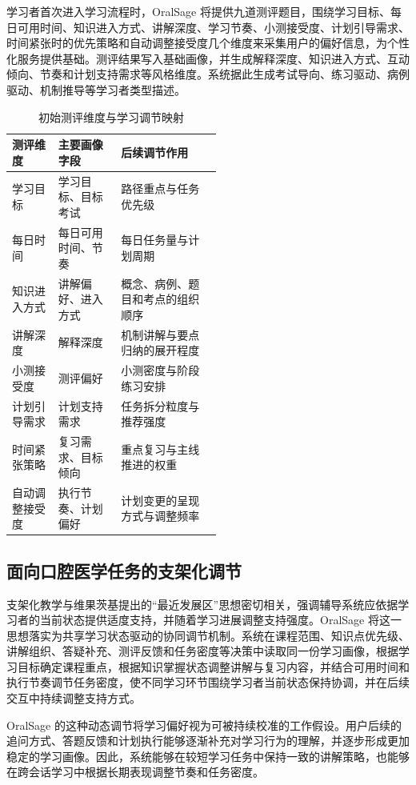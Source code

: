 学习者首次进入学习流程时，OralSage 将提供九道测评题目，围绕学习目标、每日可用时间、知识进入方式、讲解深度、学习节奏、小测接受度、计划引导需求、时间紧张时的优先策略和自动调整接受度几个维度来采集用户的偏好信息，为个性化服务提供基础。测评结果写入基础画像，并生成解释深度、知识进入方式、互动倾向、节奏和计划支持需求等风格维度。系统据此生成考试导向、练习驱动、病例驱动、机制推导等学习者类型描述。

\begin{table}[H]
  \centering
  \caption{初始测评维度与学习调节映射}
  \label{tab:onboarding-profile-mapping}
  \begin{tabularx}{\linewidth}{p{0.22\linewidth}p{0.30\linewidth}X}
    \toprule
    测评维度 & 主要画像字段 & 后续调节作用 \\
    \midrule
    学习目标 & 学习目标、目标考试 & 路径重点与任务优先级 \\
    每日时间 & 每日可用时间、节奏 & 每日任务量与计划周期 \\
    知识进入方式 & 讲解偏好、进入方式 & 概念、病例、题目和考点的组织顺序 \\
    讲解深度 & 解释深度 & 机制讲解与要点归纳的展开程度 \\
    小测接受度 & 测评偏好 & 小测密度与阶段练习安排 \\
    计划引导需求 & 计划支持需求 & 任务拆分粒度与推荐强度 \\
    时间紧张策略 & 复习需求、目标倾向 & 重点复习与主线推进的权重 \\
    自动调整接受度 & 执行节奏、计划偏好 & 计划变更的呈现方式与调整频率 \\
    \bottomrule
  \end{tabularx}
\end{table}

\subsection{面向口腔医学任务的支架化调节}

支架化教学与维果茨基提出的“最近发展区”思想密切相关，强调辅导系统应依据学习者的当前状态提供适度支持，并随着学习进展调整支持强度\cite{wood1976tutoring}。OralSage 将这一思想落实为共享学习状态驱动的协同调节机制。系统在课程范围、知识点优先级、讲解组织、答疑补充、测评反馈和任务密度等决策中读取同一份学习画像，根据学习目标确定课程重点，根据知识掌握状态调整讲解与复习内容，并结合可用时间和执行节奏调节任务密度，使不同学习环节围绕学习者当前状态保持协调，并在后续交互中持续调整支持方式。

OralSage 的这种动态调节将学习偏好视为可被持续校准的工作假设。用户后续的追问方式、答题反馈和计划执行能够逐渐补充对学习行为的理解，并逐步形成更加稳定的学习画像。因此，系统能够在较短学习任务中保持一致的讲解策略，也能够在跨会话学习中根据长期表现调整节奏和任务密度。

